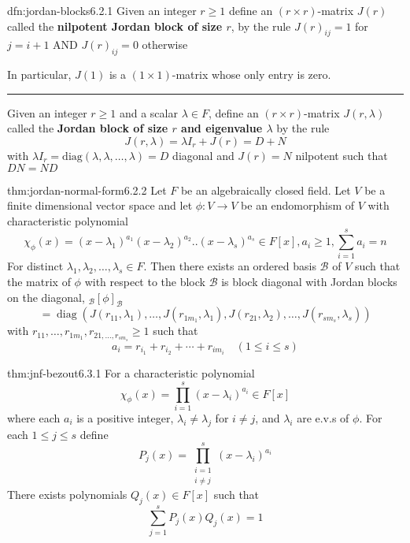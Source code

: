 \documentclass[landscape, 8pt]{extarticle}
\DeclareMathOperator{\diag}{diag}
\begin{document}
\begin{multicols}{3}
\begin{dfn}{dfn:jordan-blocks}{6.2.1}
    Given an integer $r \ge 1$ define an $(r \times r)$-matrix $J(r)$ called the \textbf{nilpotent Jordan block of size $r$}, by the rule $J(r)_{ij} = 1$ for $j = i + 1$ AND $J(r)_{ij} = 0$ otherwise

    In particular, $J(1)$ is a $(1 \times 1)$-matrix whose only entry is zero.

    \noindent\rule{\textwidth}{0.2pt}
    Given an integer $r \ge 1$ and a scalar $\lambda\in F$, define an $(r \times r)$-matrix $J(r, \lambda)$ called the \textbf{Jordan block of size $r$ and eigenvalue $\lambda$} by the rule
    \[J(r, \lambda) = \lambda I_{r} + J(r) = D + N\]
    with $\lambda I_{r} = \text{diag}(\lambda, \lambda,\dots, \lambda) = D$ diagonal and $J(r) = N$ nilpotent such that $DN = ND$
\end{dfn}


\begin{thm}{thm:jordan-normal-form}{6.2.2}
    Let $F$ be an algebraically closed field. Let $V$ be a finite dimensional vector space and let $\phi : V \to V$ be an endomorphism of $V$ with characteristic polynomial
    \[\chi_{\phi}(x) = (x - \lambda_{1})^{a_{1}}(x - \lambda_{2})^{a_{2}} . . (x - \lambda_{s})^{a_{s}}\in F[x], a_{i} \ge 1, \sum_{i = 1}^{s} a_{i} = n\]
    For distinct $\lambda_{1},\lambda_{2},\dots,\lambda_{s}\in F$. Then there exists an ordered basis $\mathcal{B}$ of $V$ such that the matrix of $\phi$ with respect to the block $\mathcal{B}$ is block diagonal with Jordan blocks on the diagonal, ${}_{\mathcal{B}}[\phi]_{\mathcal{B}}$
    \[ = \diag(J(r_{11}, \lambda_{1}),\dots,J(r_{1m_{1}}, \lambda_{1}), J(r_{21}, \lambda_{2}),\dots,J(r_{sm_{s}}, \lambda_{s}))\]
    with $r_{11},\dots,r_{1m_{1}}, r_{21,\dots,r_{sm_{s}}} \ge 1$ such that
    \[a_{i} = r_{i_{1}} + r_{i_{2}} + \cdots + r_{im_{i}} \quad (1 \le i \le s)\]
\end{thm}

\begin{thm}{thm:jnf-bezout}{6.3.1}
    For a characteristic polynomial
    \[\chi_{\phi}(x) = \prod_{i = 1}^{s} (x - \lambda_{i})^{a_{i}}\in F[x]\]
    where each $a_{i}$ is a positive integer, $\lambda_{i} \ne \lambda_{j}$ for $i\ne j$, and $\lambda_{i}$ are e.v.s of $\phi$. For each $1\le j \le s$ define
    \[P_{j}(x) = \prod_{\substack{i = 1 \\ i \ne j}}^{s} (x - \lambda_{i})^{a_{i}}\]
    There exists polynomials $Q_{j}(x)\in F[x]$ such that
    \[\sum_{j = 1}^{s} P_{j}(x)Q_{j}(x) = 1\]
\end{thm}


\end{multicols}
\end{document}
